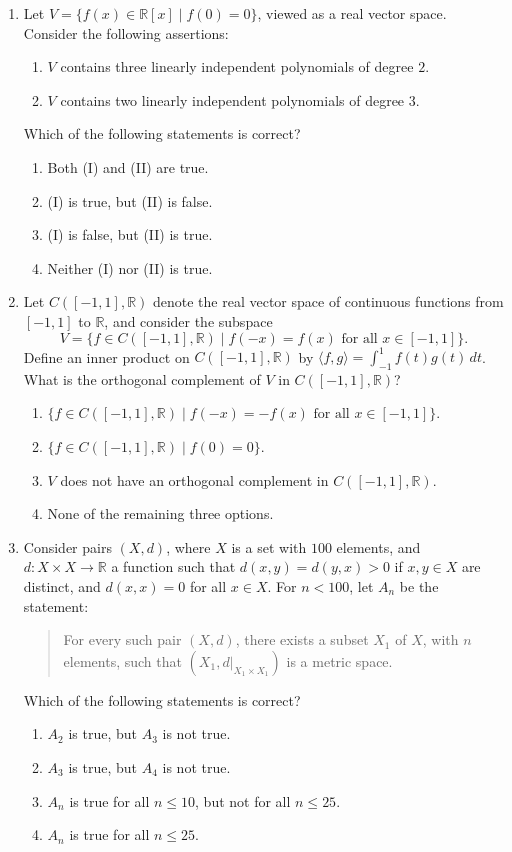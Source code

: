\documentclass[11pt, a4paper]{article}
\begin{document}
\begin{enumerate}
  \item Let $V = \{f(x) \in \mathbb{R}[x] \mid f(0) = 0\}$, viewed as a real vector space. Consider the following assertions:
  \begin{enumerate}[label=(\Roman*)]
    \item $V$ contains three linearly independent polynomials of degree $2$.
    \item $V$ contains two linearly independent polynomials of degree $3$.
  \end{enumerate}
  Which of the following statements is correct?
  \begin{enumerate}[label=(\alph*)]
    \item Both (I) and (II) are true.
    \item (I) is true, but (II) is false.
    \item (I) is false, but (II) is true.
    \item Neither (I) nor (II) is true.
  \end{enumerate}

  \item Let $C([-1, 1], \mathbb{R})$ denote the real vector space of continuous functions from $[-1, 1]$ to $\mathbb{R}$, and consider the subspace
  \[
    V = \{f \in C([-1, 1], \mathbb{R}) \mid f(-x) = f(x) \text{ for all } x \in [-1, 1]\}.
  \]
  Define an inner product on $C([-1, 1], \mathbb{R})$ by $\langle f, g \rangle = \int_{-1}^1 f(t) g(t)\,dt$. What is the orthogonal complement of $V$ in $C([-1, 1], \mathbb{R})$?
  \begin{enumerate}[label=(\alph*)]
    \item $\{f \in C([-1, 1], \mathbb{R}) \mid f(-x) = -f(x) \text{ for all } x \in [-1, 1]\}$.
    \item $\{f \in C([-1, 1], \mathbb{R}) \mid f(0) = 0\}$.
    \item $V$ does not have an orthogonal complement in $C([-1, 1], \mathbb{R})$.
    \item None of the remaining three options.
  \end{enumerate}

  \item Consider pairs $(X, d)$, where $X$ is a set with $100$ elements, and $d: X \times X \to \mathbb{R}$ a function such that $d(x, y) = d(y, x) > 0$ if $x, y \in X$ are distinct, and $d(x, x) = 0$ for all $x \in X$. For $n < 100$, let $A_n$ be the statement:
  \begin{quote}
    For every such pair $(X, d)$, there exists a subset $X_1$ of $X$, with $n$ elements, such that $(X_1, d|_{X_1 \times X_1})$ is a metric space.
  \end{quote}
  Which of the following statements is correct?
  \begin{enumerate}[label=(\alph*)]
    \item $A_2$ is true, but $A_3$ is not true.
    \item $A_3$ is true, but $A_4$ is not true.
    \item $A_n$ is true for all $n \le 10$, but not for all $n \le 25$.
    \item $A_n$ is true for all $n \le 25$.
  \end{enumerate}


\end{enumerate}
\end{document}
